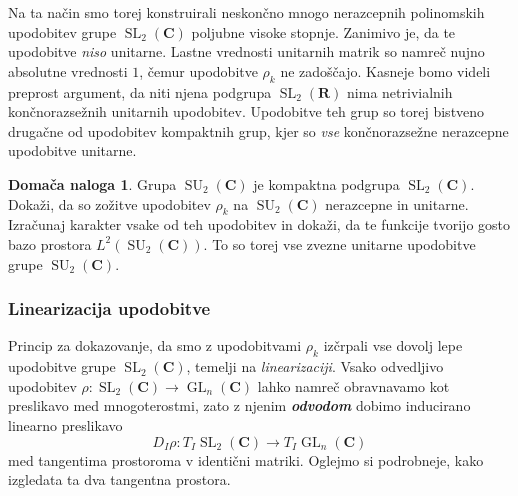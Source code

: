 \documentclass[11pt]{book}
\def\RR{\mathbf{R}}
\def\CC{\mathbf{C}}
\DeclareMathOperator\SU{SU}
\DeclareMathOperator\GL{GL}
\DeclareMathOperator\SL{SL}
\def\definicija{\color{rdeca}\bf\em}
\theoremstyle{definition}
\theoremstyle{zgled}
\theoremstyle{odprtproblem}
\theoremstyle{domacanaloga}
\newtheorem*{domacanaloga}{Domača naloga}
\theoremstyle{izrek}
\begin{document}
Na ta način smo torej konstruirali neskončno mnogo nerazcepnih polinomskih upodobitev grupe $\SL_2(\CC)$ poljubne visoke stopnje. Zanimivo je, da te upodobitve \emph{niso} unitarne. Lastne vrednosti unitarnih matrik so namreč nujno absolutne vrednosti $1$, čemur upodobitve $\rho_k$ ne zadoščajo. Kasneje bomo videli preprost argument, da niti njena podgrupa $\SL_2(\RR)$ nima netrivialnih končnorazsežnih unitarnih upodobitev. Upodobitve teh grup so torej bistveno drugačne od upodobitev kompaktnih grup, kjer so \emph{vse} končnorazsežne nerazcepne upodobitve unitarne.

\begin{domacanaloga}
Grupa $\SU_2(\CC)$ je kompaktna podgrupa $\SL_2(\CC)$. Dokaži, da so zožitve upodobitev $\rho_k$ na $\SU_2(\CC)$ nerazcepne in unitarne. Izračunaj karakter vsake od teh upodobitev in dokaži, da te funkcije tvorijo gosto bazo prostora $L^2(\SU_2(\CC))$. To so torej vse zvezne unitarne upodobitve grupe $\SU_2(\CC)$.
\end{domacanaloga}

\subsubsection{Linearizacija upodobitve}

Princip za dokazovanje, da smo z upodobitvami $\rho_k$ izčrpali vse dovolj lepe upodobitve grupe $\SL_2(\CC)$, temelji na \emph{linearizaciji}. Vsako odvedljivo upodobitev $\rho \colon \SL_2(\CC) \to \GL_n(\CC)$ lahko namreč obravnavamo kot preslikavo med mnogoterostmi, zato z njenim {\definicija odvodom} dobimo inducirano linearno preslikavo
\[
    \textstyle D_I \rho \colon T_I \SL_2(\CC) \to T_I \GL_n(\CC)
\]
med tangentima prostoroma v identični matriki. Oglejmo si podrobneje, kako izgledata ta dva tangentna prostora.
\end{document}
